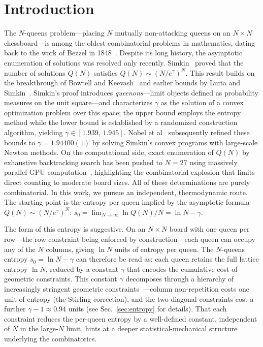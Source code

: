 \documentclass[aps, pre, reprint, amsmath, amssymb, superscriptaddress, floatfix]{revtex4-2}
\begin{document}
\maketitle


\section{Introduction}
\label{sec:intro}

The $N$-queens problem---placing $N$ mutually non-attacking queens on
an $N \times N$ chessboard---is among the oldest combinatorial
problems in mathematics, dating back to the work of Bezzel in
1848~\cite{Bezzel1848}.  Despite its long history, the asymptotic
enumeration of solutions was resolved only recently.  Simkin~\cite{Simkin2022}
proved that the number of solutions $Q(N)$ satisfies
$Q(N) \sim (N/e^{\gamma})^N$.
This result builds on the breakthrough of Bowtell and
Keevash~\cite{Bowtell2023} and earlier bounds by Luria and
Simkin~\cite{Luria2021}.  Simkin's proof introduces \emph{queenons}---limit
objects defined as probability measures on the unit square---and
characterizes $\gamma$ as the solution of a convex optimization
problem over this space; the upper bound employs the entropy method
while the lower bound is established by a randomized construction
algorithm, yielding $\gamma \in [1.939,\, 1.945]$.
Nobel et al~\cite{Nobel2023,Boyd2024} subsequently refined these
bounds to $\gamma = 1.94400(1)$ by solving
Simkin's convex programs with large-scale Newton methods.
On the computational side, exact enumeration of $Q(N)$ by exhaustive
backtracking search has been pushed to $N = 27$ using massively
parallel GPU computation~\cite{Yao2025}, highlighting the
combinatorial explosion that limits direct counting to moderate board
sizes.
All of these determinations are purely combinatorial.
In this work, we pursue an independent, thermodynamic route.
The starting point is the entropy per queen implied by the
asymptotic formula $Q(N) \sim (N/e^\gamma)^N$:
$s_0 = \lim_{N \to \infty} \ln Q(N)/N = \ln N - \gamma$.

The form of this entropy is suggestive.  On an
$N \times N$ board with one queen per row---the row constraint being
enforced by construction---each queen can occupy any of the $N$
columns, giving $\ln N$ units of entropy per queen.  The $N$-queens entropy $s_0 = \ln N - \gamma$ can
therefore be read as: each queen retains the full lattice entropy
$\ln N$, reduced by a constant $\gamma$ that encodes the cumulative
cost of geometric constraints.  This constant $\gamma$ decomposes
through a hierarchy of increasingly stringent geometric
constraints~\cite{Knuth2022,Vanderstraeten2018}---column non-repetition costs one unit
of entropy (the Stirling correction), and the two diagonal constraints
cost a further $\gamma - 1 \approx 0.94$ units
(see Sec.~\ref{sec:entropy} for details).
That each constraint reduces the per-queen entropy by a well-defined
constant, independent of $N$ in the large-$N$ limit, hints at a
deeper statistical-mechanical structure underlying the combinatorics.
\end{document}

